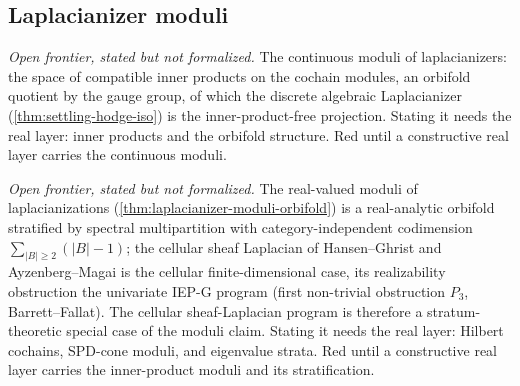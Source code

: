 \subsection{Laplacianizer moduli}

\begin{theorem}\label{thm:laplacianizer-moduli-orbifold}\notready{}
\emph{Open frontier, stated but not formalized.} The continuous moduli of
laplacianizers: the space of compatible inner products on the cochain modules,
an orbifold quotient by the gauge group, of which the discrete algebraic
Laplacianizer (\cref{thm:settling-hodge-iso}) is the inner-product-free
projection. Stating it needs the real layer: inner products and the orbifold
structure. Red until a constructive real layer carries the continuous moduli.
\end{theorem}

\begin{theorem}\label{thm:cellular-sheaf-laplacian-moduli-case}\notready{}
\emph{Open frontier, stated but not formalized.} The real-valued moduli of
laplacianizations (\cref{thm:laplacianizer-moduli-orbifold}) is a real-analytic
orbifold stratified by spectral multipartition with category-independent
codimension $\sum_{|B|\ge2}(|B|-1)$; the cellular sheaf Laplacian of
Hansen--Ghrist and Ayzenberg--Magai is the cellular finite-dimensional case,
its realizability obstruction the univariate IEP-G program (first non-trivial
obstruction $P_3$, Barrett--Fallat). The cellular sheaf-Laplacian program is
therefore a stratum-theoretic special case of the moduli claim. Stating it
needs the real layer: Hilbert cochains, SPD-cone moduli, and eigenvalue strata.
Red until a constructive real layer carries the inner-product moduli and its
stratification.
\end{theorem}
